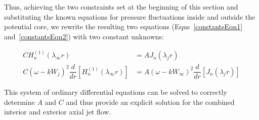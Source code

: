 \documentclass[]{aiaa-tc}%
\begin{document}
Thus, achieving the two constraints set at the beginning of this section and substituting the known equations for pressure fluctuations inside and outside the potential core, we rewrite the resulting two equations (Eqns~\ref{constantsEqn1} and~\ref{constantsEqn2}) with two constant unknowns:

\begin{align*}
C H_n^{(1)}(\lambda_{\infty} r) &= A J_n(\lambda_j r) \\
C(\omega - kW_{j})^2 \dfrac{d}{dr}\left[H_n^{(1)}(\lambda_{\infty} r)\right]
    &= A(\omega - kW_{\infty})^2 \dfrac{d}{dr}\left[ J_n(\lambda_j r) \right]
\end{align*}

This system of ordinary differential equations can be solved to correctly determine $A$ and $C$ and thus provide an explicit solution for the combined interior and exterior axial jet flow.
\end{document}

